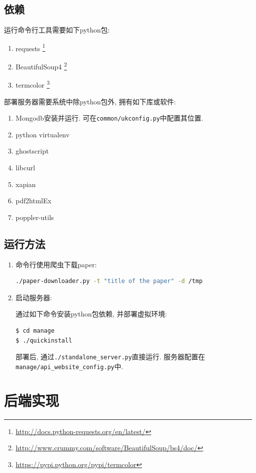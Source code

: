 \subsection{依赖}
运行命令行工具需要如下python包:
\begin{enumerate}
  \item requests \footnote{\url{http://docs.python-requests.org/en/latest/}}
  \item BeautifulSoup4 \footnote{\url{http://www.crummy.com/software/BeautifulSoup/bs4/doc/}}
  \item termcolor \footnote{\url{https://pypi.python.org/pypi/termcolor}}
\end{enumerate}

部署服务器需要系统中除python包外, 拥有如下库或软件:
\begin{enumerate}
  \item Mongodb安装并运行. 可在\verb|common/ukconfig.py|中配置其位置.
  \item python virtualenv
  \item ghostscript
  \item libcurl
  \item xapian
  \item pdf2htmlEx
  \item poppler-utils
\end{enumerate}
\subsection{运行方法}
\begin{enumerate}
    \item 命令行使用爬虫下载paper:
      \begin{lstlisting}[language=bash]
./paper-downloader.py -t "title of the paper" -d /tmp
      \end{lstlisting}

    \item 启动服务器:

通过如下命令安装python包依赖, 并部署虚拟环境:
\begin{lstlisting}[language=bash]
$ cd manage
$ ./quickinstall
\end{lstlisting}

部署后, 通过\verb|./standalone_server.py|直接运行.
服务器配置在\verb|manage/api_website_config.py|中.
\end{enumerate}


\section{后端实现}

